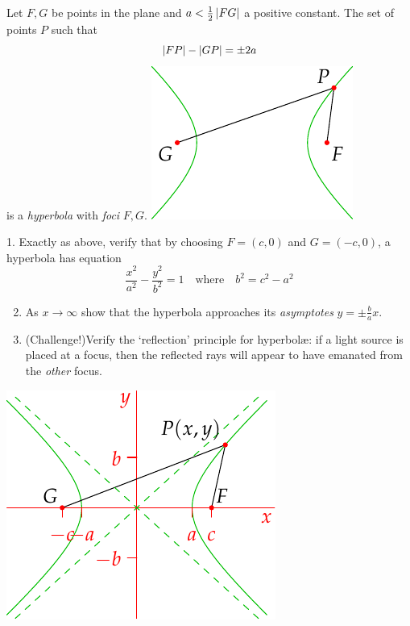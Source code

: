 \begin{defn}[lower separated=false, sidebyside, sidebyside align=top seam, sidebyside gap=0pt, righthand width=0.35\linewidth]{}{}
Let $F,G$ be points in the plane and $a<\frac 12\left| FG\right|$ a positive constant. The set of points $P$ such that
\[\left| FP\right|-\left| GP\right|=\pm 2a\]
is a \emph{hyperbola} with \emph{foci} $F,G$.
\tcblower
\flushright\includegraphics{hyperbola1}
\end{defn}

\begin{tcolorbox}[exercisestyle,lower separated=false, sidebyside, sidebyside align=top seam, sidebyside gap=0pt, righthand width=0.35\linewidth]{}{}
\hangindent\leftmargini
\textup{1. } Exactly as above, verify that by choosing $F=(c,0)$ and $G=(-c,0)$, a hyperbola has equation
\[\frac{x^2}{a^2}-\frac{y^2}{b^2}=1\quad\text{where}\quad b^2=c^2-a^2\]
\begin{enumerate}\setcounter{enumi}{1}
  \item As $x\to\infty$ show that the hyperbola approaches its \emph{asymptotes} $y=\pm \frac bax$.
  \item (Challenge!)\quad Verify the `reflection' principle for hyperbolæ: if a light source is placed at a focus, then the reflected rays will appear to have emanated from the \emph{other} focus.
\end{enumerate}
\tcblower
\flushright\includegraphics{hyperbola2}
\end{tcolorbox}


